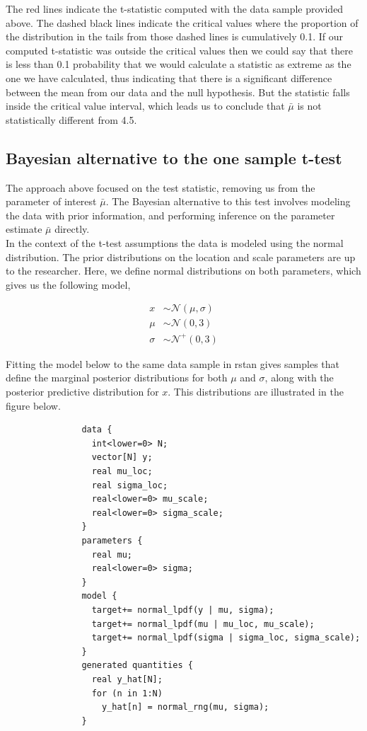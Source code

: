 \documentclass[12pt]{article}
\begin{document}
\noindent The red lines indicate the t-statistic computed with the data sample provided above. The dashed black lines indicate the critical values where the proportion of the distribution in the tails from those dashed lines is cumulatively 0.1. If our computed t-statistic was outside the critical values then we could say that there is less than 0.1 probability that we would calculate a statistic as extreme as the one we have calculated, thus indicating that there is a significant difference between the mean from our data and the null hypothesis. But the statistic falls inside the critical value interval, which leads us to conclude that $\bar{\mu}$ is not statistically different from 4.5. \\

\subsection{Bayesian alternative to the one sample t-test}

The approach above focused on the test statistic, removing us from the parameter of interest $\bar{\mu}$. The Bayesian alternative to this test involves modeling the data with prior information, and performing inference on the parameter estimate $\bar{\mu}$ directly. \\

\noindent In the context of the t-test assumptions the data is modeled using the normal distribution. The prior distributions on the location and scale parameters are up to the researcher. Here, we define normal distributions on both parameters, which gives us the following model,

\begin{align*}
x &\sim \mathcal{N}(\mu, \sigma) \\
\mu &\sim \mathcal{N}(0,3) \\
\sigma &\sim \mathcal{N}^{+}(0,3)
\end{align*}

\noindent Fitting the model below to the same data sample in rstan gives samples that define the marginal posterior distributions for both $\mu$ and $\sigma$, along with the posterior predictive distribution for $x$. This distributions are illustrated in the figure below. \\

\begin{verbatim}
               data {
                 int<lower=0> N;
                 vector[N] y;
                 real mu_loc;
                 real sigma_loc;
                 real<lower=0> mu_scale;
                 real<lower=0> sigma_scale;
               }
               parameters {
                 real mu;
                 real<lower=0> sigma;
               }
               model {
                 target+= normal_lpdf(y | mu, sigma);
                 target+= normal_lpdf(mu | mu_loc, mu_scale);
                 target+= normal_lpdf(sigma | sigma_loc, sigma_scale);
               }
               generated quantities {
                 real y_hat[N];
                 for (n in 1:N)
                   y_hat[n] = normal_rng(mu, sigma);
               }

\end{verbatim}
\end{document}
